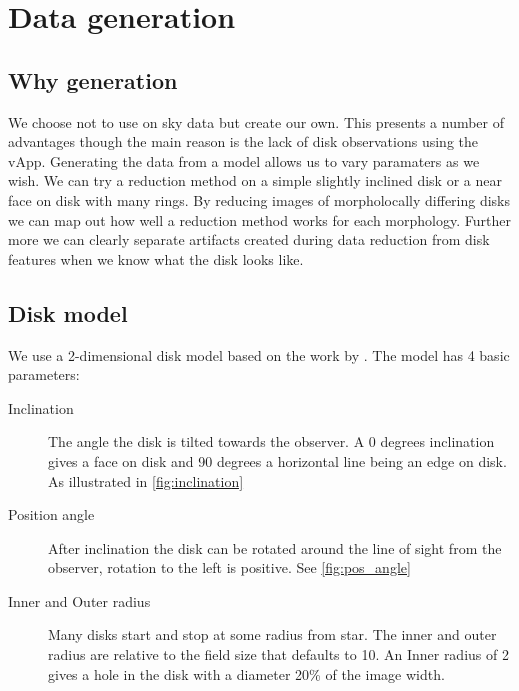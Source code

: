 
\chapter{Data generation} %

\label{ch:name} %


\section{Why generation}

We choose not to use on sky data but create our own. This presents a number of advantages though the main reason is the lack of disk observations using the vApp. Generating the data from a model allows us to vary paramaters as we wish. We can try a reduction method on a simple slightly inclined disk or a near face on disk with many rings. By reducing images of morpholocally differing disks we can map out how well a reduction method works for each morphology. Further more we can clearly separate artifacts created during data reduction from disk features when we know what the disk looks like.


\section{Disk model}

We use a 2-dimensional disk model based on the work by \cite{Pieter_Okko}. The model has 4 basic parameters: 

\begin{description}
\item[Inclination] The angle the disk is tilted towards the observer. A 0 degrees inclination gives a face on disk and 90 degrees a horizontal line being an edge on disk. As illustrated in \ref{fig:inclination}
\item[Position angle] After inclination the disk can be rotated around the line of sight from the observer, rotation to the left is positive. See \ref{fig:pos_angle}
\item[Inner and Outer radius] Many disks start and stop at some radius from star. The inner and outer radius are relative to the field size that defaults to 10. An Inner radius of 2 gives a hole in the disk with a diameter 20\% of the image width. 
\end{description}


